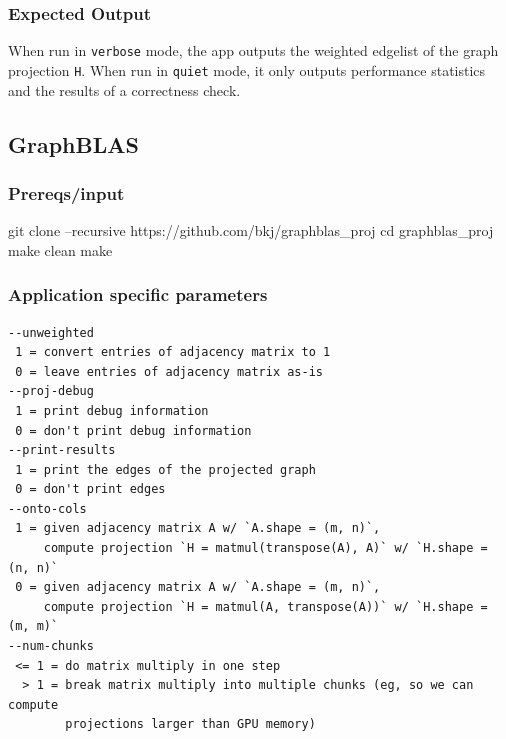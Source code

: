 \documentclass[10pt,oneside]{memoir}
\newenvironment{Shaded}{}{}
\newcommand{\BuiltInTok}[1]{#1}
\newcommand{\FunctionTok}[1]{\textcolor[rgb]{0.02,0.16,0.49}{#1}}
\newcommand{\NormalTok}[1]{#1}
\begin{document}
\hypertarget{expected-output-3}{%
\subsubsection{Expected Output}\label{expected-output-3}}

When run in \texttt{verbose} mode, the app outputs the weighted edgelist
of the graph projection \texttt{H}. When run in \texttt{quiet} mode, it
only outputs performance statistics and the results of a correctness
check.

\hypertarget{graphblas-1}{%
\subsection{GraphBLAS}\label{graphblas-1}}

\hypertarget{prereqsinput-6}{%
\subsubsection{Prereqs/input}\label{prereqsinput-6}}

\begin{Shaded}
\begin{Highlighting}[]
\FunctionTok{git}\NormalTok{ clone --recursive https://github.com/bkj/graphblas_proj}
\BuiltInTok{cd}\NormalTok{ graphblas_proj}
\FunctionTok{make}\NormalTok{ clean}
\FunctionTok{make}
\end{Highlighting}
\end{Shaded}

\hypertarget{application-specific-parameters-3}{%
\subsubsection{Application specific
parameters}\label{application-specific-parameters-3}}

\begin{verbatim}
--unweighted
 1 = convert entries of adjacency matrix to 1
 0 = leave entries of adjacency matrix as-is
--proj-debug
 1 = print debug information
 0 = don't print debug information
--print-results
 1 = print the edges of the projected graph
 0 = don't print edges
--onto-cols
 1 = given adjacency matrix A w/ `A.shape = (m, n)`,
     compute projection `H = matmul(transpose(A), A)` w/ `H.shape = (n, n)`
 0 = given adjacency matrix A w/ `A.shape = (m, n)`,
     compute projection `H = matmul(A, transpose(A))` w/ `H.shape = (m, m)`
--num-chunks
 <= 1 = do matrix multiply in one step
  > 1 = break matrix multiply into multiple chunks (eg, so we can compute
        projections larger than GPU memory)
\end{verbatim}
\end{document}
